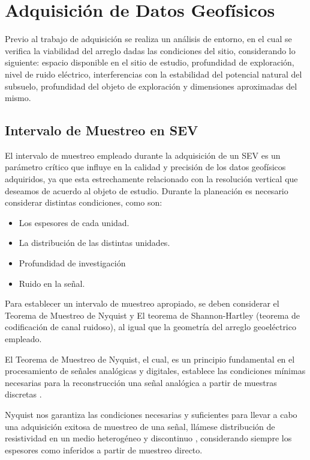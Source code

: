 	\section{Adquisición de Datos Geofísicos}
	
	Previo al trabajo de adquisición se realiza un análisis de entorno, en el cual se verifica la viabilidad del arreglo dadas las condiciones del sitio, considerando lo siguiente: espacio disponible en el sitio de estudio, profundidad de exploración, nivel de ruido eléctrico, interferencias con la estabilidad del potencial natural del subsuelo, profundidad del objeto de exploración y dimensiones aproximadas del mismo.
	
		\subsection{Intervalo de Muestreo en SEV}
			
			El intervalo de muestreo empleado durante la adquisición de un SEV es un parámetro crítico que influye en la calidad y precisión de los datos geofísicos adquiridos, ya que esta estrechamente relacionado con la resolución vertical que deseamos de acuerdo al objeto de estudio. Durante la planeación es necesario considerar distintas condiciones, como son:
			
			\begin{itemize}
				\item Los espesores de cada unidad.
				\item La distribución de las distintas unidades.
				\item Profundidad de investigación
				\item Ruido en la señal.
			\end{itemize}
			
			Para establecer un intervalo de muestreo apropiado, se deben considerar el Teorema de Muestreo de Nyquist y El teorema de Shannon-Hartley (teorema de codificación de canal ruidoso), al igual que la geometría del arreglo geoeléctrico empleado.
			
			El Teorema de Muestreo de Nyquist, el cual, es un principio fundamental en el procesamiento de señales analógicas y digitales, establece las condiciones mínimas necesarias para la reconstrucción una señal analógica a partir de muestras discretas \citep{alvarado2010}.
			
			Nyquist nos garantiza las condiciones necesarias y suficientes para llevar a cabo una adquisición exitosa de muestreo de una señal, llámese distribución de resistividad en un medio heterogéneo y discontinuo \citep{alvarado2010}, considerando siempre los espesores como inferidos a partir de muestreo directo.
			
